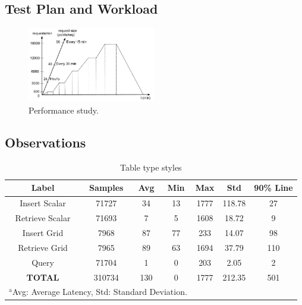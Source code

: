 \documentclass[conference]{IEEEtran}
\begin{document}
\subsection{Test Plan and Workload}
\begin{figure}[htbp]
\centerline{\includegraphics[width=0.5\textwidth]{results/work_load/performance_study_v4.jpg}}
\caption{Performance study.}
\label{fi:performance_Study}
\end{figure}

\subsection{Observations}
\begin{table}[htbp]
\caption{Table type styles}
\begin{center}
\begin{tabular}{|c|c|c|c|c|c|c|}
\hline
\textbf{Label} & \textbf{Samples} & \textbf{Avg} & \textbf{Min} & \textbf{Max} & \textbf{Std} & \textbf{90\% Line} \\ \hline
Insert Scalar & 71727 & 34 & 13 & 1777 & 118.78 & 27 \\ \hline
Retrieve Scalar & 71693 & 7 & 5 & 1608 & 18.72 & 9 \\ \hline
Insert Grid & 7968 & 87 & 77 & 233 & 14.07 & 98 \\ \hline
Retrieve Grid & 7965 & 89 & 63 & 1694 & 37.79 & 110 \\ \hline
Query & 71704 & 1 & 0 & 203 & 2.05 & 2 \\ \hline
\textbf{TOTAL} & 310734 & 130 & 0 & 1777 & 212.35 & 501 \\ \hline
\multicolumn{4}{l}{$^{\mathrm{a}}$Avg: Average Latency, Std: Standard Deviation.}
\end{tabular}
\label{tab:obs_all_auto_15_min_summary_latency}
\end{center}
\end{table}
\end{document}
